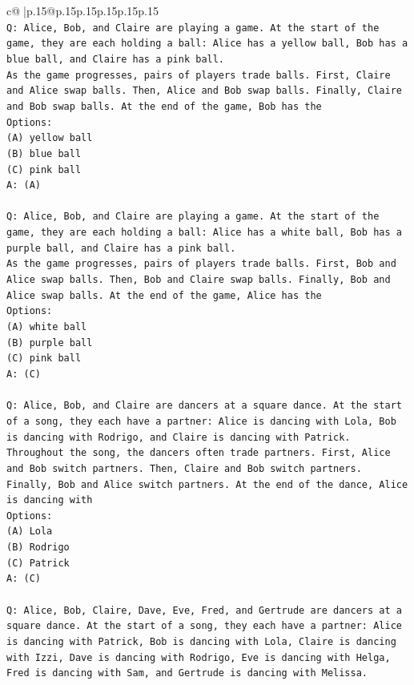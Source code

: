 \documentclass{article}
\begin{document}
{\begin{supertabular}{c@{$\;$}|p{.15\linewidth}@{}p{.15\linewidth}p{.15\linewidth}p{.15\linewidth}p{.15\linewidth}p{.15\linewidth}}
{{{\\ 
\texttt{Q: Alice, Bob, and Claire are playing a game. At the start of the game, they are each holding a ball: Alice has a yellow ball, Bob has a blue ball, and Claire has a pink ball.} \\
\texttt{As the game progresses, pairs of players trade balls. First, Claire and Alice swap balls. Then, Alice and Bob swap balls. Finally, Claire and Bob swap balls. At the end of the game, Bob has the} \\
\texttt{Options:} \\
\texttt{(A) yellow ball} \\
\texttt{(B) blue ball} \\
\texttt{(C) pink ball} \\
\texttt{A: (A)} \\
\\ 
\texttt{Q: Alice, Bob, and Claire are playing a game. At the start of the game, they are each holding a ball: Alice has a white ball, Bob has a purple ball, and Claire has a pink ball.} \\
\texttt{As the game progresses, pairs of players trade balls. First, Bob and Alice swap balls. Then, Bob and Claire swap balls. Finally, Bob and Alice swap balls. At the end of the game, Alice has the} \\
\texttt{Options:} \\
\texttt{(A) white ball} \\
\texttt{(B) purple ball} \\
\texttt{(C) pink ball} \\
\texttt{A: (C)} \\
\\ 
\texttt{Q: Alice, Bob, and Claire are dancers at a square dance. At the start of a song, they each have a partner: Alice is dancing with Lola, Bob is dancing with Rodrigo, and Claire is dancing with Patrick.} \\
\texttt{Throughout the song, the dancers often trade partners. First, Alice and Bob switch partners. Then, Claire and Bob switch partners. Finally, Bob and Alice switch partners. At the end of the dance, Alice is dancing with} \\
\texttt{Options:} \\
\texttt{(A) Lola} \\
\texttt{(B) Rodrigo} \\
\texttt{(C) Patrick} \\
\texttt{A: (C)} \\
\\ 
\texttt{Q: Alice, Bob, Claire, Dave, Eve, Fred, and Gertrude are dancers at a square dance. At the start of a song, they each have a partner: Alice is dancing with Patrick, Bob is dancing with Lola, Claire is dancing with Izzi, Dave is dancing with Rodrigo, Eve is dancing with Helga, Fred is dancing with Sam, and Gertrude is dancing with Melissa.} \\
}}}
\end{supertabular}}
\end{document}
